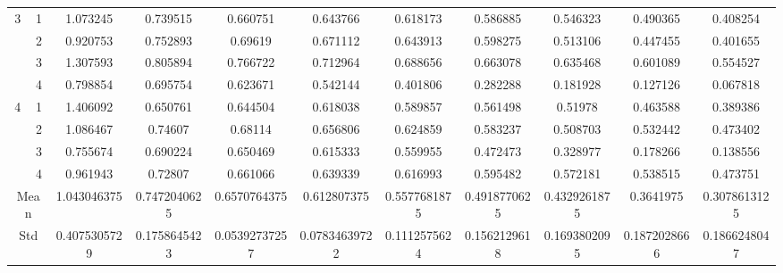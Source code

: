 \documentclass[draft,dvipsnames]{drexel-thesis}
\begin{document}
\begin{thesis}
\begin{table}[!t]
{\begin{tabular}{|c|c|c|c|c|c|c|c|c|c|c|}
\multirow{4}{*}{3}    & 1                   & 1.073245     & 0.739515     & 0.660751      & 0.643766      & 0.618173     & 0.586885     & 0.546323     & 0.490365     & 0.408254     \\ \cline{2-11}
                      & 2                   & 0.920753     & 0.752893     & 0.69619       & 0.671112      & 0.643913     & 0.598275     & 0.513106     & 0.447455     & 0.401655     \\ \cline{2-11}
                      & 3                   & 1.307593     & 0.805894     & 0.766722      & 0.712964      & 0.688656     & 0.663078     & 0.635468     & 0.601089     & 0.554527     \\ \cline{2-11}
                      & 4                   & 0.798854     & 0.695754     & 0.623671      & 0.542144      & 0.401806     & 0.282288     & 0.181928     & 0.127126     & 0.067818     \\ \hline
\multirow{4}{*}{4}    & 1                   & 1.406092     & 0.650761     & 0.644504      & 0.618038      & 0.589857     & 0.561498     & 0.51978      & 0.463588     & 0.389386     \\ \cline{2-11}
                      & 2                   & 1.086467     & 0.74607      & 0.68114       & 0.656806      & 0.624859     & 0.583237     & 0.508703     & 0.532442     & 0.473402     \\ \cline{2-11}
                      & 3                   & 0.755674     & 0.690224     & 0.650469      & 0.615333      & 0.559955     & 0.472473     & 0.328977     & 0.178266     & 0.138556     \\ \cline{2-11}
                      & 4                   & 0.961943     & 0.72807      & 0.661066      & 0.639339      & 0.616993     & 0.595482     & 0.572181     & 0.538515     & 0.473751     \\ \hline
\multicolumn{2}{|c|}{Mean}                  & 1.043046375  & 0.7472040625 & 0.6570764375  & 0.612807375   & 0.5577681875 & 0.4918770625 & 0.4329261875 & 0.3641975    & 0.3078613125 \\ \hline
\multicolumn{2}{|c|}{Std}                   & 0.4075305729 & 0.1758645423 & 0.05392737257 & 0.07834639722 & 0.1112575624 & 0.1562129618 & 0.1693802095 & 0.1872028666 & 0.1866248047 \\ \hline
\end{tabular}}
\end{table}


\end{thesis}
\end{document}
